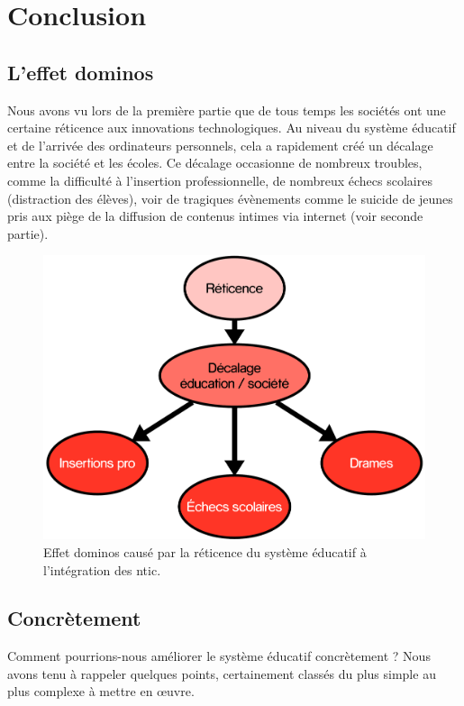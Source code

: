 
\part{Conclusion}\label{conclu}

\chapter*{L'effet dominos}
Nous avons vu lors de la première partie que de tous temps les sociétés ont une certaine réticence aux innovations technologiques. Au niveau du système éducatif et de l'arrivée des ordinateurs personnels, cela a rapidement créé un décalage entre la société et les écoles. Ce décalage occasionne de nombreux troubles, comme la difficulté à l'insertion professionnelle, de nombreux échecs scolaires (distraction des élèves), voir de tragiques évènements comme le suicide de jeunes pris aux piège de la diffusion de contenus intimes via internet (voir seconde partie).

\begin{figure}[H]
  \includegraphics[width=\textwidth]{../resources/illustrations/ccl}
  \caption{Effet dominos causé par la réticence du système éducatif à l'intégration des \gls{ntic}.}
\end{figure}

\chapter*{Concrètement}
Comment pourrions-nous améliorer le système éducatif concrètement ? Nous avons tenu à rappeler quelques points, certainement classés du plus simple au plus complexe à mettre en œuvre.

